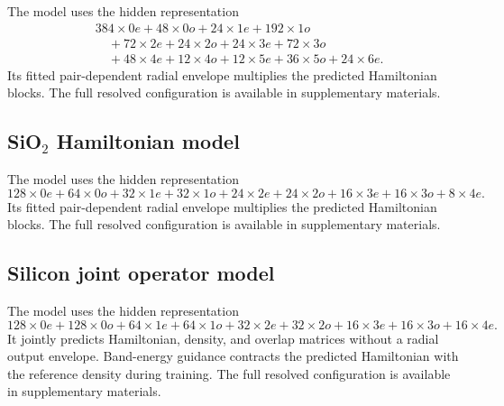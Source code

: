 The model uses the hidden representation
\begin{align*}
&384{\times}0e+48{\times}0o+24{\times}1e+192{\times}1o\\
&\quad+72{\times}2e+24{\times}2o+24{\times}3e+72{\times}3o\\
&\quad+48{\times}4e+12{\times}4o+12{\times}5e+36{\times}5o+24{\times}6e.
\end{align*}
Its fitted pair-dependent radial envelope multiplies the predicted Hamiltonian blocks. The full resolved configuration is available in supplementary materials.

\subsection{SiO$_2$ Hamiltonian model}
\label{app:model-config-sio2}

The model uses the hidden representation
\[
128{\times}0e+64{\times}0o+32{\times}1e+32{\times}1o+
24{\times}2e+24{\times}2o+16{\times}3e+16{\times}3o+8{\times}4e.
\]
Its fitted pair-dependent radial envelope multiplies the predicted Hamiltonian blocks. The full resolved configuration is available in supplementary materials.

\subsection{Silicon joint operator model}
\label{app:model-config-silicon}

The model uses the hidden representation
\[
128{\times}0e+128{\times}0o+64{\times}1e+64{\times}1o+
32{\times}2e+32{\times}2o+16{\times}3e+16{\times}3o+16{\times}4e.
\]
It jointly predicts Hamiltonian, density, and overlap matrices without a radial output envelope. Band-energy guidance contracts the predicted Hamiltonian with the reference density during training. The full resolved configuration is available in supplementary materials.
